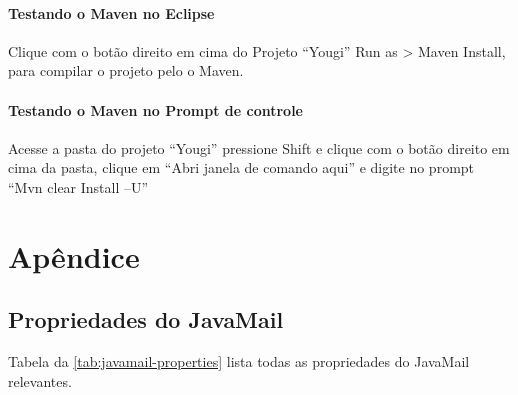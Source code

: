 \documentclass[envcountsame,envcountchap,letterpaper]{svmono}
\begin{document}
\subsection {Testando o Maven no Eclipse}

Clique com o botão direito em cima do Projeto “Yougi” Run as > Maven Install, para compilar o projeto pelo o Maven. 

\subsection {Testando o Maven no Prompt de controle}

Acesse a pasta do projeto “Yougi” pressione Shift e clique com o botão direito em cima da pasta, clique em “Abri janela de comando aqui” e digite no prompt “Mvn clear Install –U”

\part*{Apêndice}

\chapter*{Propriedades do JavaMail}

Tabela da \ref{tab:javamail-properties} lista todas as propriedades do JavaMail relevantes.
\end{document}
